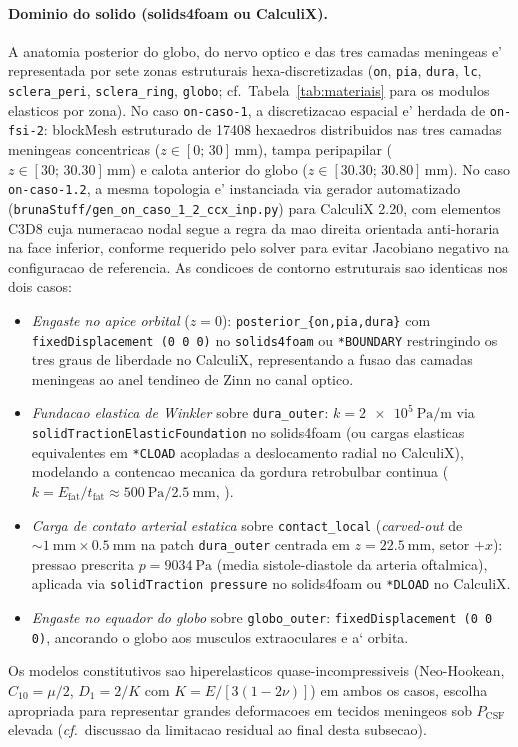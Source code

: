 \paragraph{Dominio do solido (solids4foam ou CalculiX).} A anatomia posterior do globo, do nervo optico e das tres camadas meningeas e' representada por sete zonas estruturais hexa-discretizadas (\texttt{on}, \texttt{pia}, \texttt{dura}, \texttt{lc}, \texttt{sclera\_peri}, \texttt{sclera\_ring}, \texttt{globo}; cf.~Tabela~\ref{tab:materiais} para os modulos elasticos por zona). No caso \texttt{on-caso-1}, a discretizacao espacial e' herdada de \texttt{on-fsi-2}: blockMesh estruturado de \num{17408} hexaedros distribuidos nas tres camadas meningeas concentricas ($z \in [0;\, 30]\,\si{\milli\meter}$), tampa peripapilar ($z \in [30;\, 30.30]\,\si{\milli\meter}$) e calota anterior do globo ($z \in [30.30;\, 30.80]\,\si{\milli\meter}$). No caso \texttt{on-caso-1.2}, a mesma topologia e' instanciada via gerador automatizado (\texttt{brunaStuff/gen\_on\_caso\_1\_2\_ccx\_inp.py}) para CalculiX 2.20, com elementos C3D8 cuja numeracao nodal segue a regra da mao direita orientada anti-horaria na face inferior, conforme requerido pelo solver para evitar Jacobiano negativo na configuracao de referencia. As condicoes de contorno estruturais sao identicas nos dois casos:
\begin{itemize}
  \item \emph{Engaste no apice orbital} ($z = 0$): \texttt{posterior\_\{on,pia,dura\}} com \texttt{fixedDisplacement (0 0 0)} no \texttt{solids4foam} ou \texttt{*BOUNDARY} restringindo os tres graus de liberdade no CalculiX, representando a fusao das camadas meningeas ao anel tendineo de Zinn no canal optico.
  \item \emph{Fundacao elastica de Winkler} sobre \texttt{dura\_outer}: $k = \SI{2e5}{\pascal\per\meter}$ via \texttt{solidTractionElasticFoundation} no solids4foam (ou cargas elasticas equivalentes em \texttt{*CLOAD} acopladas a deslocamento radial no CalculiX), modelando a contencao mecanica da gordura retrobulbar continua ($k = E_{\mathrm{fat}} / t_{\mathrm{fat}} \approx \SI{500}{\pascal} / \SI{2.5}{\milli\meter}$, \citet{Schoemaker2006, Yoo2011}).
  \item \emph{Carga de contato arterial estatica} sobre \texttt{contact\_local} (\emph{carved-out} de $\sim \SI{1}{\milli\meter} \times \SI{0.5}{\milli\meter}$ na patch \texttt{dura\_outer} centrada em $z = \SI{22.5}{\milli\meter}$, setor $+x$): pressao prescrita $p = \SI{9034}{\pascal}$ (media sistole-diastole da arteria oftalmica), aplicada via \texttt{solidTraction pressure} no solids4foam ou \texttt{*DLOAD} no CalculiX.
  \item \emph{Engaste no equador do globo} sobre \texttt{globo\_outer}: \texttt{fixedDisplacement (0 0 0)}, ancorando o globo aos musculos extraoculares e a` orbita.
\end{itemize}
Os modelos constitutivos sao hiperelasticos quase-incompressiveis (Neo-Hookean, $C_{10} = \mu / 2$, $D_1 = 2/K$ com $K = E / [3(1-2\nu)]$) em ambos os casos, escolha apropriada para representar grandes deformacoes em tecidos meningeos sob $P_{\mathrm{CSF}}$ elevada (\emph{cf.}~discussao da limitacao residual ao final desta subsecao).

